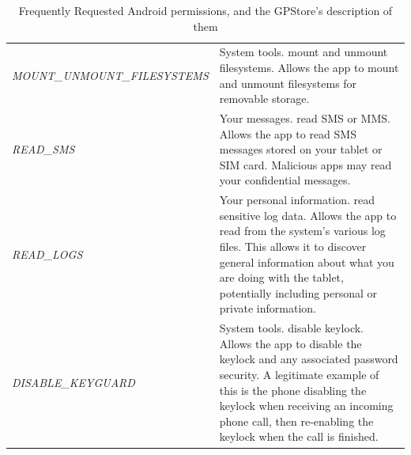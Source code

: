 \begin{table}[t]
\begin{small}
\begin{tabular}{p{3cm}|p{12.5cm}}
\textit{MOUNT\_UNMOUNT\_\-FILESYSTEMS} & System tools. mount and unmount filesystems. Allows the app to mount and unmount filesystems for removable storage.  \\
\textit{READ\_SMS} & Your messages. read SMS or MMS. Allows the app to read SMS messages stored on your tablet or SIM card.  Malicious apps may read your confidential messages. \\
\textit{READ\_LOGS} & Your personal information. read sensitive log data. Allows the app to read from the system's various log files.  This allows it to discover general information about what you are doing with the tablet, potentially including personal or private information.  \\
\textit{DISABLE\_KEYGUARD} & System tools. disable keylock. Allows the app to disable the keylock and any associated password security.  A legitimate example of this is the phone disabling the keylock when receiving an incoming phone call, then re-enabling the keylock when the call is finished.  \\

\end{tabular}
\end{small}
\caption{Frequently Requested Android permissions, and the GPStore's description of them}
\label{tab:perms}
\end{table}





